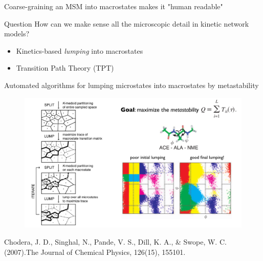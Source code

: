 \documentclass{beamer}
\begin{document}
\begin{frame}{Coarse-graining an MSM into macrostates makes it "human readable"}

\begin{block}{Question}
How can we make sense all the microscopic detail in kinetic network models?
\end{block}

\begin{itemize}
  \item Kinetics-based \textit{lumping} into macrostates
  \item Transition Path Theory (TPT)
\end{itemize}

\vskip 1cm

\end{frame}


\begin{frame}{Automated algorithms for lumping microstates into macrostates by metastability}


\begin{figure}
\includegraphics[width=1.0\textwidth]{metastability-lumping}
\end{figure}

\tiny
Chodera, J. D., Singhal, N., Pande, V. S., Dill, K. A., \& Swope, W. C. (2007).The Journal of Chemical Physics, 126(15), 155101.
\normalsize

\end{frame}
\end{document}
